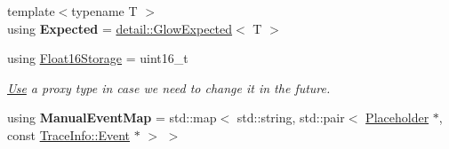 \begin{DoxyCompactItemize}
{\footnotesize template$<$typename T $>$ }\\using {\bfseries Expected} = \hyperlink{classglow_1_1detail_1_1_glow_expected}{detail\+::\+Glow\+Expected}$<$ T $>$
\item 
\mbox{\label{namespaceglow_aef6c68d23f8def44c72bbab5ee153bb7}} 
using \hyperlink{namespaceglow_aef6c68d23f8def44c72bbab5ee153bb7}{Float16\+Storage} = uint16\+\_\+t
\begin{DoxyCompactList}\small\item\em \hyperlink{structglow_1_1_use}{Use} a proxy type in case we need to change it in the future. \end{DoxyCompactList}\item 
\mbox{\label{namespaceglow_a2e0b05ad621e4c545de25546f7093b81}} 
using {\bfseries Manual\+Event\+Map} = std\+::map$<$ std\+::string, std\+::pair$<$ \hyperlink{classglow_1_1_placeholder}{Placeholder} $\ast$, const \hyperlink{structglow_1_1_trace_info_1_1_event}{Trace\+Info\+::\+Event} $\ast$ $>$ $>$
\end{DoxyCompactItemize}
